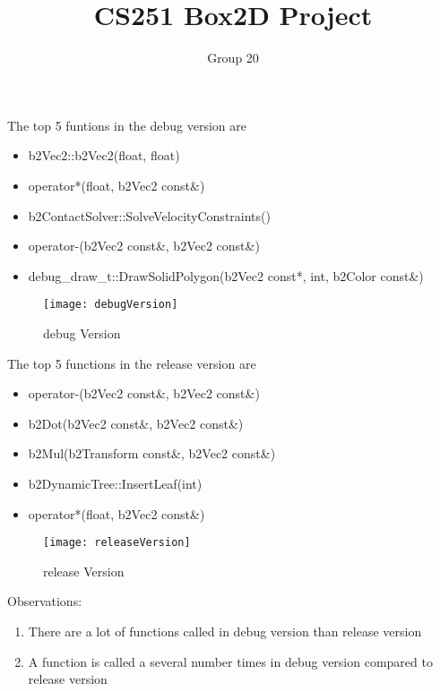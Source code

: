 \documentclass[a4paper,11pt]{article}
\begin{document}
\title{CS251 Box2D Project}
\author{Group 20}
\maketitle

The top 5 funtions in the debug version are
\begin{itemize} 
\item b2Vec2::b2Vec2(float, float)
\item operator*(float, b2Vec2 const\&)
\item b2ContactSolver::SolveVelocityConstraints()
\item operator-(b2Vec2 const\&, b2Vec2 const\&)
\item debug\_draw\_t::DrawSolidPolygon(b2Vec2 const*, int, b2Color const\&)
\end{itemize}
\begin{figure}[h]
\centering\texttt{[image: debugVersion]}
\caption{debug Version}
\end{figure}
The top 5 functions in the release version are
\begin{itemize}
\item operator-(b2Vec2 const\&, b2Vec2 const\&)
\item b2Dot(b2Vec2 const\&, b2Vec2 const\&)
\item b2Mul(b2Transform const\&, b2Vec2 const\&)
\item b2DynamicTree::InsertLeaf(int)
\item operator*(float, b2Vec2 const\&)
\end{itemize}
\begin{figure}[h]
\centering\texttt{[image: releaseVersion]}
\caption{release Version}
\end{figure}
Observations: \\
\begin{enumerate}
\item There are a lot of functions called in debug version than release version
\item A function is called a several number times in debug version compared to release version
\end{enumerate}
\end{document}
